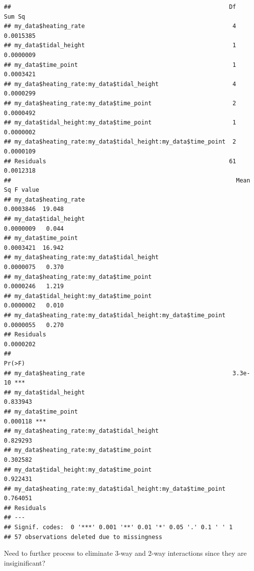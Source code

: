 \documentclass[
]{article}
\newenvironment{Shaded}{\begin{snugshade}}{\end{snugshade}}
\newcommand{\AttributeTok}[1]{\textcolor[rgb]{0.77,0.63,0.00}{#1}}
\newcommand{\FunctionTok}[1]{\textcolor[rgb]{0.00,0.00,0.00}{#1}}
\newcommand{\NormalTok}[1]{#1}
\newcommand{\OtherTok}[1]{\textcolor[rgb]{0.56,0.35,0.01}{#1}}
\newcommand{\SpecialCharTok}[1]{\textcolor[rgb]{0.00,0.00,0.00}{#1}}
\begin{document}
\begin{verbatim}
##                                                              Df    Sum Sq
## my_data$heating_rate                                          4 0.0015385
## my_data$tidal_height                                          1 0.0000009
## my_data$time_point                                            1 0.0003421
## my_data$heating_rate:my_data$tidal_height                     4 0.0000299
## my_data$heating_rate:my_data$time_point                       2 0.0000492
## my_data$tidal_height:my_data$time_point                       1 0.0000002
## my_data$heating_rate:my_data$tidal_height:my_data$time_point  2 0.0000109
## Residuals                                                    61 0.0012318
##                                                                Mean Sq F value
## my_data$heating_rate                                         0.0003846  19.048
## my_data$tidal_height                                         0.0000009   0.044
## my_data$time_point                                           0.0003421  16.942
## my_data$heating_rate:my_data$tidal_height                    0.0000075   0.370
## my_data$heating_rate:my_data$time_point                      0.0000246   1.219
## my_data$tidal_height:my_data$time_point                      0.0000002   0.010
## my_data$heating_rate:my_data$tidal_height:my_data$time_point 0.0000055   0.270
## Residuals                                                    0.0000202        
##                                                                Pr(>F)    
## my_data$heating_rate                                          3.3e-10 ***
## my_data$tidal_height                                         0.833943    
## my_data$time_point                                           0.000118 ***
## my_data$heating_rate:my_data$tidal_height                    0.829293    
## my_data$heating_rate:my_data$time_point                      0.302582    
## my_data$tidal_height:my_data$time_point                      0.922431    
## my_data$heating_rate:my_data$tidal_height:my_data$time_point 0.764051    
## Residuals                                                                
## ---
## Signif. codes:  0 '***' 0.001 '**' 0.01 '*' 0.05 '.' 0.1 ' ' 1
## 57 observations deleted due to missingness
\end{verbatim}

Need to further process to eliminate 3-way and 2-way interactions since
they are insiginificant?

\begin{Shaded}
\end{Shaded}
\end{document}
